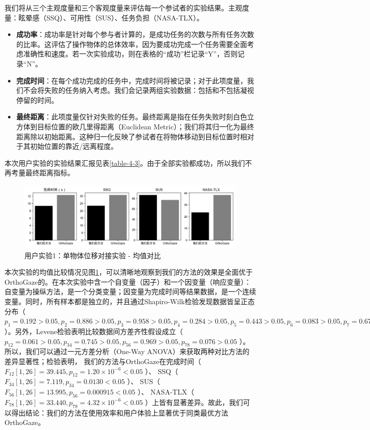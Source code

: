 我们将从三个主观度量和三个客观度量来评估每一个参试者的实验结果。主观度量：眩晕感（SSQ）、可用性（SUS）、任务负担（NASA-TLX）。

\begin{itemize}[wide]
	\item {\bf 成功率}：成功率是针对每个参与者计算的，是成功任务的次数与所有任务次数的比率。这评估了操作物体的总体效率，因为要成功完成一个任务需要全面考虑准确性和速度。若一次实验成功，则在表格的“成功”栏记录“Y”，否则记录“N”。
	\item {\bf 完成时间}：在每个成功完成的任务中，完成时间将被记录；对于此项度量，我们不会将失败的任务纳入考虑。我们会记录两组实验数据：包括和不包括凝视停留的时间。
	\item {\bf 最终距离}：此项度量仅针对失败的任务。最终距离是指在任务失败时刻白色立方体到目标位置的欧几里得距离（Euclidean Metric）；我们将其归一化为最终距离除以初始距离。这种归一化反映了参试者在将物体移动到目标位置时相对于其初始位置的靠近/远离程度。
\end{itemize}

本次用户实验的实验结果汇报见表\ref{table-4-3}。由于全部实验都成功，所以我们不再考量最终距离指标。

\begin{figure}[b!]
    \centering
    \includegraphics[width=\textwidth]{figure/user-study-1-avg.png}
    \caption{用户实验1：单物体位移对接实验 - 均值对比}
    \label{fig-4-2}
\end{figure}

本次实验的均值比较情况见图\ref{fig-4-2}，可以清晰地观察到我们的方法的效果是全面优于OrthoGaze的。在本次实验中含一个自变量（因子）和一个因变量（响应变量）：自变量为操纵方法，是一个分类变量；因变量为完成时间等结果数据，是一个连续变量。同时，所有样本都是独立的，并且通过Shapiro-Wilk检验发现数据皆呈正态分布（ $p_1 = 0.192 > 0.05, p_2 = 0.886 > 0.05, p_3 = 0.958 > 0.05, p_4 = 0.284 > 0.05, p_5 = 0.443 > 0.05, p_6 = 0.083 > 0.05, p_7 = 0.671 > 0.05, p_8 = 0.821 > 0.05$ ）。另外，Levene检验表明比较数据间方差齐性假设成立（ $p_{12} = 0.061 > 0.05, p_{34} = 0.745 > 0.05, p_{56} = 0.969 > 0.05, p_{78} = 0.076 > 0.05$ ）。所以，我们可以通过一元方差分析（One-Way ANOVA）来获取两种对比方法的差异显著性；检验表明，
我们的方法与OrthoGaze在完成时间（ $F_{12}[1, 26] = 39.445, p_{12} = 1.20 \times 10^{-6} < 0.05$ ）、
SSQ（ $F_{34}[1, 26] = 7.119, p_{34} = 0.0130 < 0.05$ ）、
SUS（ $F_{56}[1, 26] = 13.995, p_{56} = 0.000915 < 0.05$ ）、
NASA-TLX（ $F_{78}[1, 26] = 33.440, p_{78} = 4.32 \times 10^{-6} < 0.05$ ）上皆有显著差异。故此，我们可以得出结论：我们的方法在使用效率和用户体验上显著优于同类最优方法OrthoGaze。

